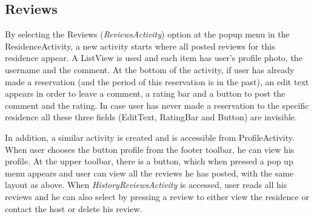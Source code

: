 \documentclass[12pt]{article}
\begin{document}
	\subsection{Reviews}
	
	By selecting the Reviews (\textit{ReviewsActivity}) option at the popup menu in the ResidenceActivity, a new activity starts where all posted reviews for this residence appear. A ListView is used and each item has user's profile photo, the username and the comment. At the bottom of the activity, if user has already made a reservation (and the period of this reservation is in the past), an edit text appears in order to leave a comment, a rating bar and a button to post the comment and the rating. In case user has never made a reservation to the specific residence all these three fields (EditText, RatingBar and Button) are invisible. 
	
	In addition, a similar activity is created and is accessible from ProfileActivity. When user chooses the button profile from the footer toolbar, he can view his profile. At the upper toolbar, there is a button, which when pressed a pop up menu appears and user can view all the reviews he has posted, with the same layout as above. When \textit{HistoryReviewsActivity} is accessed, user reads all his reviews and he can also select by pressing a review to either view the residence or contact the host or delete his review.
	
\end{document}
